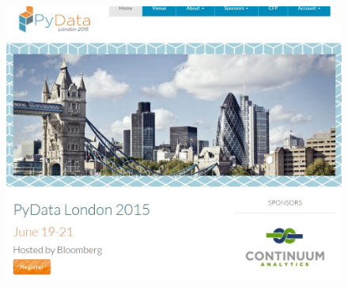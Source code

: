 \documentclass[MASTER.tex]{subfiles}
\begin{document}
\begin{frame}
\begin{figure}
\centering
\includegraphics[width=1.1\linewidth]{pydatalondon}
\end{figure}
\end{frame}
\end{document}
